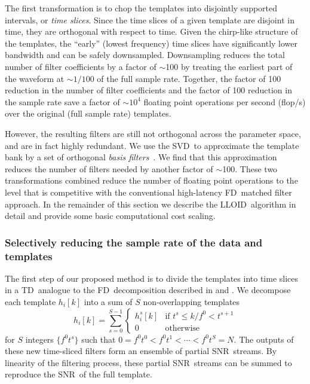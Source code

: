 \documentclass[preprint2]{aastex}
\newcommand{\SNR}{SNR}%
\newcommand{\SVD}{SVD}%
\newcommand{\flops}{flop/s}
\newcommand{\lloid}{LLOID}%
\newcommand{\TD}{TD}%
\newcommand{\FD}{FD}%
\begin{document}
The first transformation is to chop the templates into disjointly supported
intervals, or \emph{time slices}.  Since the time slices of a given template
are disjoint in time, they are orthogonal with respect to time.  Given the
chirp-like structure of the templates, the ``early'' (lowest frequency) time
slices have significantly lower bandwidth and can be safely downsampled.
Downsampling reduces the total number of filter coefficients by a factor of
$\sim$100 by treating the earliest part of the waveform at $\sim$$1/100$ of
the full sample rate.  Together, the factor of 100 reduction in the number of
filter coefficients and the factor of 100 reduction in the sample rate save a
factor of $\sim$$10^4$ floating point operations per second (\flops) over the
original (full sample rate) templates.

However, the resulting filters are still not
orthogonal across the parameter space, and are in fact highly redundant.
We use the \SVD\ to approximate the template bank by a set of orthogonal
\emph{basis filters}~\citep{Cannon:2010p10398}.  We find that this approximation
reduces the number of filters needed by another factor of $\sim$100.  These two
transformations combined reduce the number of floating point operations
to the level that is competitive with the conventional high-latency \FD\
matched filter approach.  In the remainder of this section we describe the
\lloid\ algorithm in detail and provide some basic computational cost scaling.

\subsubsection{Selectively reducing the sample rate of the data and templates}
\label{sec:time-slices}

The first step of our proposed method is to divide the templates into time
slices in a \TD\ analogue to the \FD\ decomposition described
in \citet{Marion2004} and \citet{Buskulic2010}.  We decompose each template
$h_{i}[k]$ into a sum of $S$ non-overlapping templates
%
\begin{equation}
\label{eq:time-slices}
h_{i}[k] = \sum_{s=0}^{S-1}
	\begin{cases}
		h_i^s[k] & \textrm{if } t^s \leqslant k / f^0 < t^{s+1} \\
		0 & \textrm{otherwise}
	\end{cases}
\end{equation}
%
for $S$ integers $\{f^0 t^s\}$ such that $0  = f^0 t^0 < f^0 t^1 < \cdots < f^0
t^S = N$.  The outputs of these new time-sliced filters
form an ensemble of partial \SNR\ streams.  By linearity of the filtering
process, these partial \SNR\ streams can be summed to reproduce the
\SNR\ of the full template.
\end{document}
